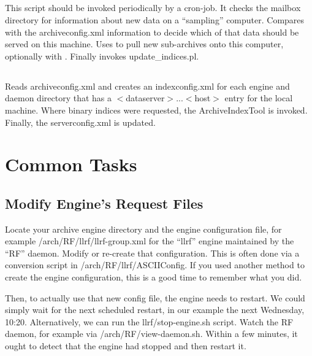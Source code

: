 \subsection{} \label{sec:updateServer}
This script should be invoked periodically by a cron-job.
It checks the mailbox directory for information about new data on a
``sampling'' computer. Compares with the archiveconfig.xml information
to decide which of that data should be served on this machine. Uses
 to pull new sub-archives onto this computer,
optionally with .  Finally invokes update\_indices.pl.

\subsection{} \label{sec:updateIndices}
Reads archiveconfig.xml and creates an indexconfig.xml for each
engine and daemon directory that has a $<$dataserver$>$...$<$host$>$
entry for the local machine.
Where binary indices were requested, the ArchiveIndexTool is invoked.
Finally, the serverconfig.xml is updated.

\section{Common Tasks}
\subsection{Modify Engine's Request Files}
Locate your archive engine directory and the engine configuration
file, for example /arch/RF/llrf/llrf-group.xml for the ``llrf'' engine
maintained by the ``RF'' daemon.  Modify or re-create that
configuration. This is often done via a conversion script in
/arch/RF/llrf/ASCIIConfig. If you used another method to create the
engine configuration, this is a good time to remember what you did.

Then, to actually use that new config file, the engine needs to
restart. We could simply wait for the next scheduled restart, in our
example the next Wednesday, 10:20. Alternatively, we can run the
llrf/stop-engine.sh script.
Watch the RF daemon, for example via /arch/RF/view-daemon.sh.
Within a few minutes, it ought to detect that the engine had stopped
and then restart it.


